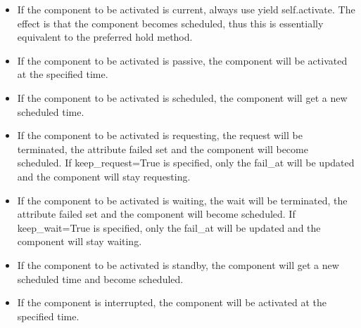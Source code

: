 \documentclass[letterpaper,10pt,english]{sphinxmanual}
\begin{document}
\begin{sphinxVerbatim}[commandchars=\\\{\}]
    
  
    
  
\end{sphinxVerbatim}
\begin{itemize}
\item {} 
If the component to be activated is current, always use yield self.activate. The effect is that the
component becomes scheduled, thus this is essentially equivalent to the preferred hold method.

\item {} 
If the component to be activated is passive, the component will be activated at the specified time.

\item {} 
If the component to be activated is scheduled, the component will get a new scheduled time.

\item {} 
If the component to be activated is requesting, the request will be
terminated, the attribute failed set and the component will become scheduled. If keep\_request=True
is specified, only the fail\_at will be updated and the component will stay requesting.

\item {} 
If the component to be activated is waiting, the wait will be
terminated, the attribute failed set and the component will become scheduled. If keep\_wait=True
is specified, only the fail\_at will be updated and the component will stay waiting.

\item {} 
If the component to be activated is standby, the component will get a new scheduled time and become
scheduled.

\item {} 
If the component is interrupted, the component will be activated at the specified time.

\end{itemize}
\end{document}
